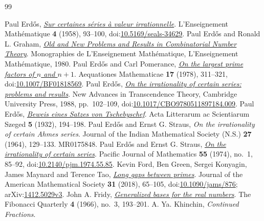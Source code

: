\begin{thebibliography}{99}
\small\raggedright\setlength{\itemsep}{0pt}
 Paul Erd\H{o}s, \href{https://users.renyi.hu/~p_erdos/1958-19.pdf}{\emph{Sur certaines s\'eries \`a valeur irrationnelle}}.
  L'Enseignement Mathématique \textbf{4} (1958), 93--100, doi:\href{https://doi.org/10.5169/seals-34629}{10.5169/seals-34629}.
 Paul Erd\H{o}s and Ronald L. Graham, \href{https://mathweb.ucsd.edu/~ronspubs/80_11_number_theory.pdf}{\emph{Old and New Problems and Results in Combinatorial Number Theory}}.
  Monographies de L'Enseignement Mathématique, L'Enseignement Mathématique, 1980.
 Paul Erd\H{o}s and Carl Pomerance, \href{https://doi.org/10.1007/BF01818569}{\emph{On the largest prime factors of $n$ and $n+1$}}.
  Aequationes Mathematicae \textbf{17} (1978), 311--321, doi:\href{https://doi.org/10.1007/BF01818569}{10.1007/BF01818569}.
 Paul Erd\H{o}s, \href{https://doi.org/10.1017/CBO9780511897184.009}{\emph{On the irrationality of certain series: problems and results}}.
  New Advances in Transcendence Theory, Cambridge University Press, 1988, pp.~102--109, doi:\href{https://doi.org/10.1017/CBO9780511897184.009}{10.1017/CBO9780511897184.009}.
 Paul Erd\H{o}s, \href{https://users.renyi.hu/~p_erdos/1932-01.pdf}{\emph{Beweis eines Satzes von Tschebyschef}}.
  Acta Litterarum ac Scientiarum Szeged \textbf{5} (1932), 194--198.
 Paul Erd\H{o}s and Ernst G. Straus, \emph{On the irrationality of certain Ahmes series}.
  Journal of the Indian Mathematical Society (N.S.) \textbf{27} (1964), 129--133. MR0175848.
 Paul Erd\H{o}s and Ernst G. Straus, \href{https://doi.org/10.2140/pjm.1974.55.85}{\emph{On the irrationality of certain series}}.
  Pacific Journal of Mathematics \textbf{55} (1974), no.~1, 85--92, doi:\href{https://doi.org/10.2140/pjm.1974.55.85}{10.2140/pjm.1974.55.85}.
 Kevin Ford, Ben Green, Sergei Konyagin, James Maynard and Terence Tao, \href{https://arxiv.org/abs/1412.5029v3}{\emph{Long gaps between primes}}.
  Journal of the American Mathematical Society \textbf{31} (2018), 65--105, doi:\href{https://doi.org/10.1090/jams/876}{10.1090/jams/876}; arXiv:\href{https://arxiv.org/abs/1412.5029v3}{1412.5029v3}.
 John A. Fridy, \href{https://www.fq.math.ca/Scanned/4-3/fridy.pdf}{\emph{Generalized bases for the real numbers}}.
  The Fibonacci Quarterly \textbf{4} (1966), no.~3, 193--201.
 A. Ya. Khinchin, \emph{Continued Fractions}.

\end{thebibliography}
